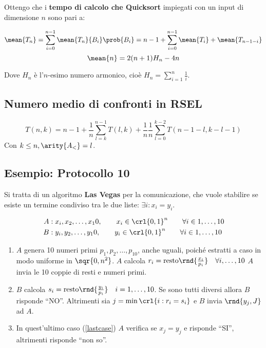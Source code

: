 \documentclass[\main/main.tex]{subfiles}
\begin{document}
\formulaProbTot{}

Ottengo che i \textbf{tempo di calcolo che Quicksort} impiegati con un input di dimensione \(n\) sono pari a:

\[
	\mean{T_n} = \sum_{i = 0}^{n-1} \mean{T_n}{B_i} \prob{B_i} = n-1 + \sum_{i = 0}^{n-1} \mean{T_i} + \mean{T_{n-1-i}}
\]
\[
	\mean{n} = 2(n+1)H_n - 4n
\]

Dove \(H_n\) è l'\(n\)-esimo numero armonico, cioè \(H_n = \sum_{i=1}^n \frac{1}{i}\).

\subsection{Numero medio di confronti in RSEL}
\[
	T(n,k) = n-1 + \frac{1}{n}\sum_{l=k}^{n-1} T(l,k) + \frac{1}{n} \frac{1}{n}\sum_{l=0}^{k-2} T(n-1-l, k-l-1)
\]
Con \(k\leq n, \arity{A_<} = l\).

\subsection{Esempio: Protocollo 10}
Si tratta di un algoritmo \textbf{Las Vegas} per la comunicazione, che vuole stabilire se esiste un termine condiviso tra le due liste: \(\exists i: x_i = y_i\).

\begin{align*}
	A & : x_i, x_2, \ldots, x_10, \qquad x_i \in \crl{0,1}^n \qquad \forall i \in 1, \ldots, 10 \\
	B & : y_i, y_2, \ldots, y_10, \qquad y_i \in \crl{0,1}^n \qquad \forall i \in 1, \ldots, 10
\end{align*}

\begin{enumerate}
	\item \(A\) genera 10 numeri primi \(p_1, p_2, \ldots, p_10\), anche uguali, poiché estratti a caso in modo uniforme in \(\sqr{0, n^2}\).
	      \subitem \(A\) calcola \(r_i = \text{resto}\rnd{\frac{x_i}{p_i}} \quad \forall i, \ldots, 10\)
	      \subitem \(A\) invia le 10 coppie di resti e numeri primi.
	\item \(B\) calcola \(s_i = \text{resto}\rnd{\frac{y_i}{p_i}} \quad i = 1, \ldots, 10\).
	      \subitem Se sono tutti diversi allora \(B\) risponde ``NO''.
	      \subitem Altrimenti sia \(j=\min\crl{i: r_i = s_i}\) e \(B\) invia \(\rnd{y_j, J}\) ad \(A\). \label{lastcase}
	\item In quest'ultimo caso (\ref{lastcase}) \(A\) verifica se \(x_j = y_j\) e risponde ``SI'', altrimenti risponde ``non so''.
\end{enumerate}
\end{document}

